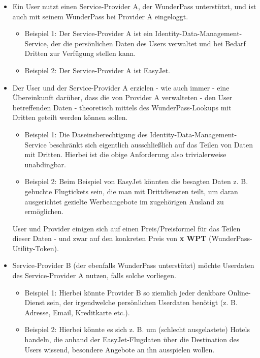 \vspace{0.3cm}

\begin{Solution}

\begin{itemize}
  \item Ein User nutzt einen Service-Provider A, der WunderPass unterstützt, und ist auch mit seinem WunderPass bei Provider A eingeloggt.
  \begin{itemize}
  	\item Beispiel 1: Der Service-Provider A ist ein Identity-Data-Management-Service, der die persönlichen Daten des Users verwaltet und bei Bedarf Dritten zur Verfügung stellen kann.
  	\item Beispiel 2: Der Service-Provider A ist EasyJet.
  \end{itemize}
  \item Der User und der Service-Provider A erzielen - wie auch immer - eine Übereinkunft darüber, dass die von Provider A verwalteten - den User betreffenden Daten - theoretisch mittels des WunderPass-Lookups mit Dritten geteilt werden können sollen. 
  \begin{itemize}
  	\item Beispiel 1: Die Daseinsberechtigung des Identity-Data-Management-Service beschränkt sich eigentlich ausschließlich auf das Teilen von Daten mit Dritten. Hierbei ist die obige Anforderung also trivialerweise unabdingbar.
  	\item Beispiel 2: Beim Beispiel von EasyJet könnten die besagten Daten z. B. gebuchte Flugtickets sein, die man mit Drittdiensten teilt, um daran ausgerichtet gezielte Werbeangebote im zugehörigen Ausland zu ermöglichen.
  \end{itemize}
  User und Provider einigen sich auf einen Preis/Preisformel für das Teilen dieser Daten - und zwar auf den konkreten Preis von \textbf{x WPT} (WunderPass-Utility-Token).
  \item Service-Provider B (der ebenfalls WunderPass unterstützt) möchte Userdaten des Service-Provider A nutzen, falls solche vorliegen.
  \begin{itemize}
  	\item Beispiel 1: Hierbei könnte Provider B so ziemlich jeder denkbare Online-Dienst sein, der irgendwelche persönlichen Userdaten benötigt (z. B. Adresse, Email, Kreditkarte etc.).
  	\item Beispiel 2: Hierbei könnte es sich z. B. um (schlecht ausgelastete) Hotels handeln, die anhand der EasyJet-Flugdaten über die Destination des Users wissend, besondere Angebote an ihn ausspielen wollen.

\end{itemize}
\end{itemize}
\end{Solution}
